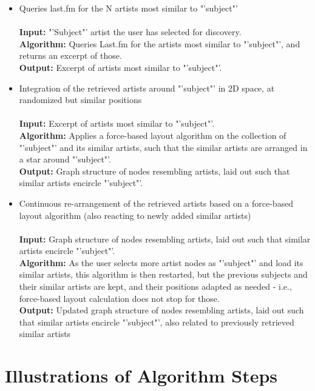 \begin{itemize}
	\item Queries last.fm for the N artists most similar to "'subject"'\\\\
				\textbf{Input:} "'Subject"' artist the user has selected for discovery. \\
				\textbf{Algorithm:} Queries Last.fm for the artists most similar to "'subject"', and returns
				an excerpt of those. \\
				\textbf{Output:} Excerpt of artists most similar to "'subject"'. \\
	\item Integration of the retrieved artists around "'subject"' in 2D space, at randomized but similar positions \\\\
				\textbf{Input:} Excerpt of artists most similar to "'subject"'. \\
				\textbf{Algorithm:} Applies a force-based layout algorithm on the collection of "'subject"' and
				its similar artists, such that the similar artists are arranged in a star around "'subject"'. \\
				\textbf{Output:} Graph structure of nodes resembling artists, laid out such that similar
				artists encircle "'subject"'. \\
	\item Continuous re-arrangement of the retrieved artists based on a force-based layout algorithm (also reacting to newly added similar artists) \\\\
				\textbf{Input:} Graph structure of nodes resembling artists, laid out such that similar
				artists encircle "'subject"'. \\
				\textbf{Algorithm:} As the user selects more artist nodes as "'subject"' and load
				its similar artists, this algorithm is then restarted, but the previous subjects and their
				similar artists are kept, and their positions adapted as needed - i.e., force-based layout
				calculation does not stop for those. \\
				\textbf{Output:} Updated graph structure of nodes resembling artists, laid out such that similar artists encircle "'subject"', also related to previously retrieved similar artists \\
\end{itemize}

\section{Illustrations of Algorithm Steps}

